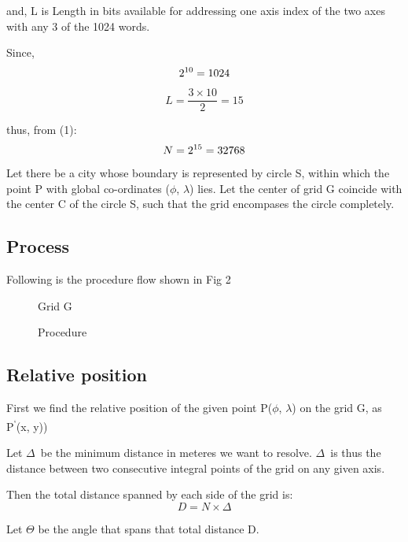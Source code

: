\documentclass[conference]{IEEEtran}
\begin{document}
and, L is Length in bits available for addressing one axis index of the two axes with any 3 of the 1024 words.

Since, \begin{equation}2\textsuperscript{10}  = 1024\end{equation}

\begin{equation}L = \frac {3 \times 10} {2} = 15 \end{equation}

thus, from (1):
\begin{equation}N = 2\textsuperscript{15} = 32768 \end{equation}

Let there be a city whose boundary is represented by circle S, within which the point P with global co-ordinates ($\phi$, $\lambda$) lies. Let the center of grid G coincide with the center C of the circle S, such that the grid encompases the circle completely.

\subsection{Process} Following is the procedure flow shown in Fig 2

\begin{figure}[!h]
\centerline{}
\caption{Grid G}
\label{Grid}
\end{figure}

\begin{figure}[!h]
\centerline{}
\caption{Procedure}
\label{Procedure}
\end{figure}

\subsection{Relative position} First we find the relative position of the given point P($\phi$, $\lambda$) on the grid G, as P\textsuperscript{`}(x, y))

Let $\Delta$\ be the minimum distance in meteres we want to resolve.
$\Delta$\ is thus the distance between two consecutive integral points of the grid on any given axis.

Then the total distance spanned by each side of the grid is:
\begin{equation}D = N \times \Delta\end{equation}

Let $\Theta$ be the angle that spans that total distance D.
\end{document}
